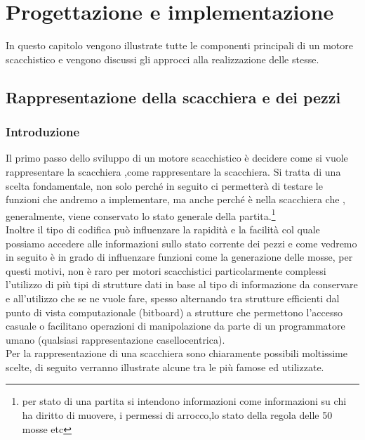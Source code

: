\chapter{Progettazione e implementazione}
%

\begin{citazione}
    In questo capitolo vengono illustrate tutte le componenti principali di un motore scacchistico e vengono discussi gli approcci alla realizzazione delle stesse.
\end{citazione}

\newpage
\section{Rappresentazione della scacchiera e dei pezzi}

\subsection{Introduzione} %
Il primo passo dello sviluppo di un motore scacchistico è decidere come si vuole rappresentare
la scacchiera ,come rappresentare la scacchiera. Si tratta di una scelta fondamentale, non solo perché in seguito ci permetterà
di testare le funzioni che andremo a implementare, ma anche perché è nella scacchiera che , generalmente,
viene conservato lo stato generale della partita.\footnote{per stato di una partita si intendono informazioni come
    informazioni su chi ha diritto di muovere, i permessi di arrocco,lo stato della regola delle 50 mosse etc}
\\Inoltre il tipo di codifica può influenzare la rapidità
e la facilità col quale possiamo accedere alle informazioni sullo stato corrente dei pezzi
e come vedremo in seguito è in grado di influenzare funzioni come la generazione delle mosse, per questi motivi,
non è raro per motori scacchistici particolarmente complessi l'utilizzo di più tipi di strutture dati in base
al tipo di informazione da conservare e all'utilizzo che se ne vuole fare, spesso alternando tra strutture efficienti dal punto di vista computazionale (bitboard) a strutture che permettono l'accesso casuale o facilitano 
operazioni di manipolazione da parte di un programmatore umano (qualsiasi rappresentazione casellocentrica).
\\Per la rappresentazione di una scacchiera sono chiaramente possibili moltissime scelte, di seguito
verranno illustrate alcune tra le più famose ed utilizzate.

